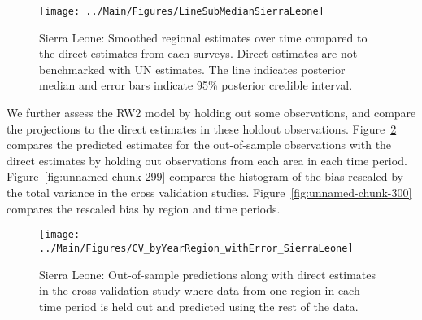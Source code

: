 \documentclass[12pt]{article}\usepackage[]{graphicx}\usepackage[]{color}
\newenvironment{knitrout}{}{} %
\begin{document}
\begin{knitrout}
\color{fgcolor}\begin{figure}[bht]

{\centering \texttt{[image: ../Main/Figures/LineSubMedianSierraLeone]} 

}

\caption[Sierra Leone]{Sierra Leone: Smoothed regional estimates over time compared to the direct estimates from each surveys. Direct estimates are not benchmarked with UN estimates. The line indicates posterior median and error bars indicate 95\% posterior credible interval.}\label{fig:unnamed-chunk-297}
\end{figure}


\end{knitrout}
We further assess the RW2 model by holding out some observations, and compare the projections to the direct estimates in these holdout observations. Figure~\ref{fig:unnamed-chunk-298} compares the predicted estimates for the out-of-sample observations  with the direct estimates by holding out observations from each area in each time period.  Figure~\ref{fig:unnamed-chunk-299} compares the histogram of the bias rescaled by the total variance in the cross validation studies. Figure~\ref{fig:unnamed-chunk-300} compares the rescaled bias by region and time periods.



 
\begin{knitrout}
\color{fgcolor}\begin{figure}[bht]

{\centering \texttt{[image: ../Main/Figures/CV\_byYearRegion\_withError\_SierraLeone]} 

}

\caption[Sierra Leone]{Sierra Leone: Out-of-sample predictions along with direct estimates in the cross validation study where data from one region in each time period is held out and predicted using the rest of the data.}\label{fig:unnamed-chunk-298}
\end{figure}


\end{knitrout}
\end{document}
